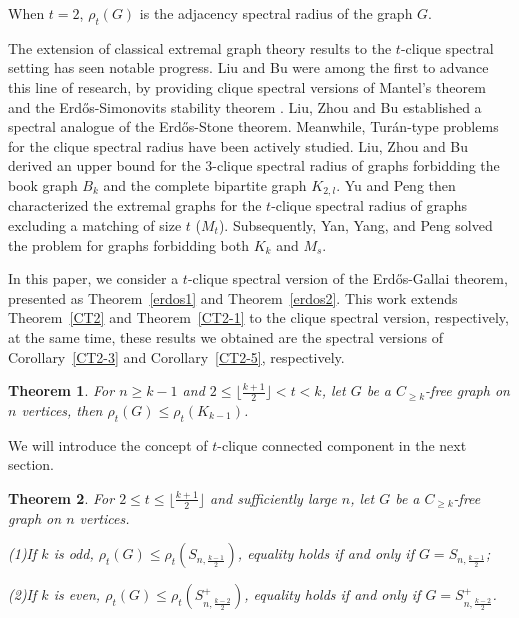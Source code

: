 \documentclass[preprint,12pt]{elsarticle}
\newtheorem{thm}{Theorem}[section]
\begin{document}
        When $t=2$, $\rho_t(G)$ is the adjacency spectral radius of the graph $G$.









        The extension of classical extremal graph theory results to the $t$-clique spectral setting has seen notable progress. Liu and Bu were among the first to advance this line of research, by providing clique spectral versions of Mantel's theorem \cite{Liu2023} and the Erd\H{o}s-Simonovits stability theorem \cite{Liu2024}. Liu, Zhou and Bu \cite{Liu2025} established a spectral analogue of the Erd\H{o}s-Stone theorem. Meanwhile, Tur\'{a}n-type problems for the clique spectral radius have been actively studied. Liu, Zhou and Bu \cite{Liu20231} derived an upper bound for the $3$-clique spectral radius of graphs forbidding the book graph $B_k$ and the complete bipartite graph $K_{2,l}$. Yu and Peng \cite{Yu2026} then characterized the extremal graphs for the $t$-clique spectral radius of graphs excluding a matching of size $t$ ($M_t$). Subsequently, Yan, Yang, and Peng \cite{Yan2026} solved the problem for graphs forbidding both $K_{k}$ and $M_{s}$.

        In this paper, we consider a $t$-clique spectral version of the Erd\H{o}s-Gallai theorem, presented as Theorem~\ref{erdos1} and Theorem~\ref{erdos2}. This work extends Theorem~\ref{CT2} and Theorem~\ref{CT2-1} to the clique spectral version, respectively, at the same time, these results we obtained are the spectral versions of Corollary~\ref{CT2-3} and Corollary~\ref{CT2-5}, respectively.


        \begin{thm}\label{CT1-1}
            For $n \geq k-1$ and $2 \leq \lfloor \frac{k+1}{2} \rfloor < t < k$, let $G$ be a $C_{\geq{k}}$-free graph on $n$ vertices, then $\rho_t(G) \leq \rho_t(K_{k-1})$.

        \end{thm}

        We will introduce the concept of $t $-clique connected component in the next section.

        \begin{thm}\label{CT1}
            For $2 \leq t \leq \lfloor \frac{k+1}{2} \rfloor$ and sufficiently large $n$, let $G$ be a $C_{\geq{k}}$-free graph on $n$ vertices.

            \noindent (1)If $k$ is odd, $\rho_t(G) \leq \rho_t(S_{n, \frac{k-1}{2} })$, equality holds if and only if $G = S_{n, \frac{k-1}{2} }$;

            \noindent (2)If $k$ is even, $\rho_t(G) \leq \rho_t(S_{n, \frac{k-2}{2} }^+)$, equality holds if and only if $G = S_{n, \frac{k-2}{2} }^+$.

		\end{thm}
\end{document}
